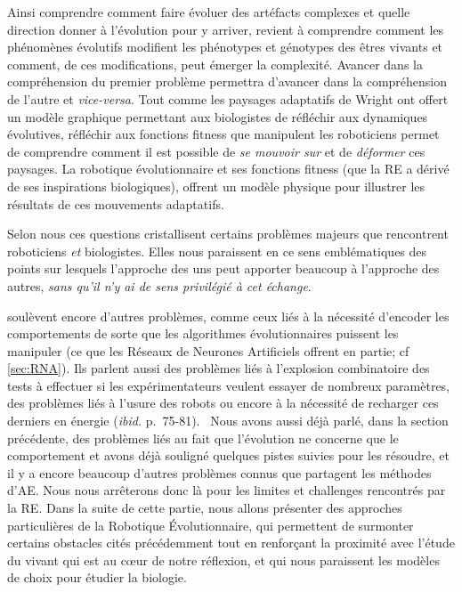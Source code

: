 Ainsi comprendre comment faire évoluer des artéfacts complexes et quelle direction donner à l'évolution pour y arriver, revient à comprendre comment les phénomènes évolutifs modifient les phénotypes et génotypes des êtres vivants et comment, de ces modifications, peut émerger la complexité. Avancer dans la compréhension du premier problème permettra d'avancer dans la compréhension de l'autre et \emph{vice-versa}.
Tout comme les paysages adaptatifs de Wright ont offert un modèle graphique permettant aux biologistes de réfléchir aux dynamiques évolutives, réfléchir aux fonctions fitness que manipulent les roboticiens permet de comprendre comment il est possible de \emph{se mouvoir sur} et de \emph{déformer} ces paysages. La robotique évolutionnaire et ses fonctions fitness (que la RE a dérivé de ses inspirations biologiques), offrent un modèle physique pour illustrer les résultats de ces mouvements adaptatifs.

Selon nous ces questions cristallisent certains problèmes majeurs que rencontrent roboticiens \emph{et} biologistes. Elles nous paraissent en ce sens emblématiques des points sur lesquels l'approche des uns peut apporter beaucoup à l'approche des autres, \emph{sans qu'il n'y ai de sens privilégié à cet échange}.

\cite{mataric96challengesinevolvingcontrollersforphysicalrobots} soulèvent encore d'autres problèmes, comme ceux liés à la nécessité d'encoder les comportements de sorte que les algorithmes évolutionnaires puissent les manipuler (ce que les Réseaux de Neurones Artificiels offrent en partie; cf \ref{sec:RNA}). Ils parlent aussi des problèmes liés à l'explosion combinatoire des tests à effectuer si les expérimentateurs veulent essayer de nombreux paramètres, des problèmes liés à l'usure des robots ou encore à la nécessité de recharger ces derniers en énergie (\emph{ibid.} p.~75-81).  Nous avons aussi déjà parlé, dans la section précédente, des problèmes liés au fait que l'évolution ne concerne que le comportement et avons déjà souligné quelques pistes suivies pour les résoudre, et il y a encore beaucoup d'autres problèmes connus que partagent les méthodes d'AE. Nous nous arrêterons donc là pour les limites et challenges rencontrés par la RE.
Dans la suite de cette partie, nous allons présenter des approches particulières de la Robotique \'Evolutionnaire, qui permettent de surmonter certains obstacles cités précédemment tout en renforçant la proximité avec l'étude du vivant qui est au c{\oe}ur de notre réflexion, et qui nous paraissent les modèles de choix pour étudier la biologie.

